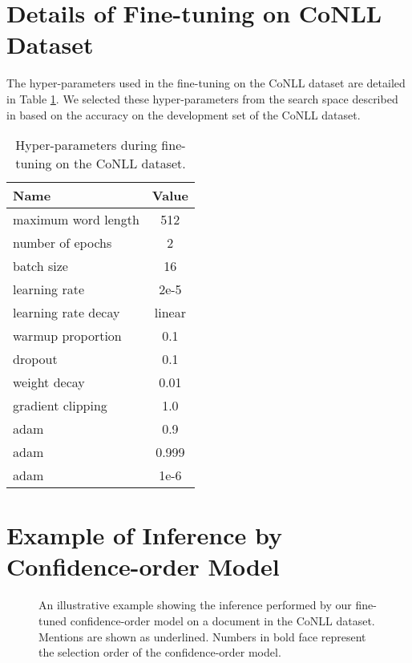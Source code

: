 \documentclass[11pt,a4paper]{article}
\begin{document}
\section{Details of Fine-tuning on CoNLL Dataset}
\label{sec:fine-tuning-details}
The hyper-parameters used in the fine-tuning on the CoNLL dataset are detailed in Table \ref{tb:fine-tuning-config}.
We selected these hyper-parameters from the search space described in  based on the accuracy on the development set of the CoNLL dataset.

\begin{table}[tbhp]
  \centering
  \begin{tabular}{l|c}
    \hline
    Name                & Value  \\
    \hline
    maximum word length & 512    \\
    number of epochs    & 2      \\
    batch size          & 16     \\
    learning rate       & 2e-5   \\
    learning rate decay & linear \\
    warmup proportion   & 0.1    \\
    dropout             & 0.1    \\
    weight decay        & 0.01   \\
    gradient clipping   & 1.0    \\
    adam       & 0.9    \\
    adam       & 0.999  \\
    adam      & 1e-6   \\
    \hline
  \end{tabular}
  \caption{Hyper-parameters during fine-tuning on the CoNLL dataset.}
  \label{tb:fine-tuning-config}
\end{table}

\section{Example of Inference by Confidence-order Model}
\label{sec:inference-example}

\begin{figure*}[tbhp]
  \centering
  \caption{An illustrative example showing the inference performed by our fine-tuned confidence-order model on a document in the CoNLL dataset. Mentions are shown as underlined. Numbers in bold face represent the selection order of the confidence-order model.}
  \label{fig:inference-example}
\end{figure*}
\end{document}
